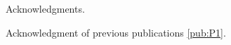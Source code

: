 
\begin{acknowledgments}

Acknowledgments.

Acknowledgment of previous publications \ref{pub:P1}.

\end{acknowledgments}
